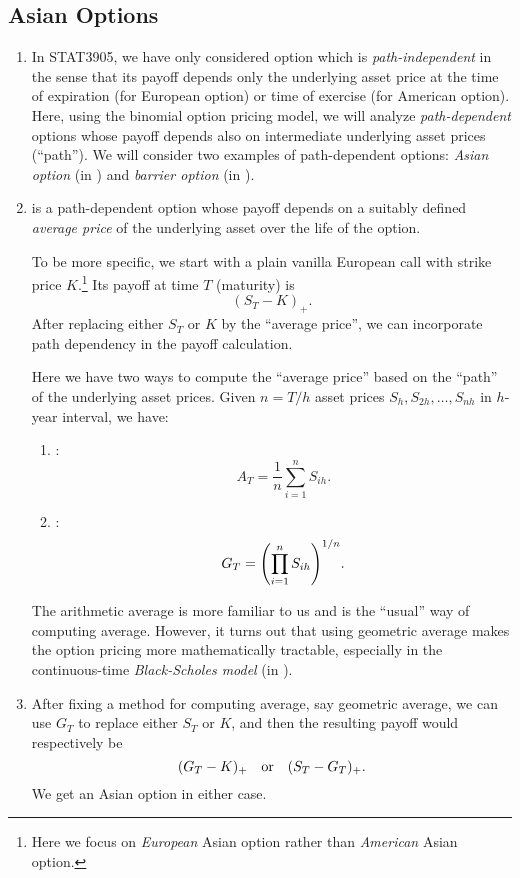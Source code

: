 \subsection{Asian Options}
\label{subsect:asian-option}
\begin{enumerate}
\item In STAT3905, we have only considered option which is
\emph{path-independent} in the sense that its payoff depends only the
underlying asset price at the time of expiration (for European option) or time
of exercise (for American option). Here, using the binomial option pricing
model, we will analyze \emph{path-dependent} options whose payoff depends also
on intermediate underlying asset prices (``path''). We will consider two
examples of path-dependent options: \emph{Asian option} (in
) and \emph{barrier option} (in
).

\item {} is a path-dependent option whose payoff depends on a
suitably defined \emph{average price} of the underlying asset over the life of
the option.

To be more specific, we start with a plain vanilla European call with strike
price \(K\).\footnote{Here we focus on \emph{European} Asian option rather than
\emph{American} Asian option.} Its payoff at time \(T\) (maturity) is
\[
(S_T-K)_{+}.
\]
After replacing either \(S_T\) or \(K\) by the ``average price'', we can
incorporate path dependency in the payoff calculation.

Here we have two ways to compute the ``average price'' based on the ``path''
of the underlying asset prices. Given \(n=T/h\) asset prices
\(S_h,S_{2h},\dotsc,S_{nh}\) in \(h\)-year interval, we have:
\begin{enumerate}
\item {}:
\[
A_T=\frac{1}{n}\sum_{i=1}^{n}S_{ih}.
\]
\item {}:
\[
G_T=\qty(\prod_{i=1}^{n}S_{ih})^{1/n}.
\]
\end{enumerate}
The arithmetic average is more familiar to us and is the ``usual'' way of
computing average. However, it turns out that using geometric average makes the
option pricing more mathematically tractable, especially in the continuous-time
\emph{Black-Scholes model} (in ).

\item After fixing a method for computing average, say geometric average, we
can use \(G_T\) to replace either \(S_T\) or \(K\), and then the resulting
payoff would respectively be
\[
(G_T-K)_{+}\qqtext{or}(S_T-G_T)_{+}.
\]
We get an Asian option in either case.


\end{enumerate}
